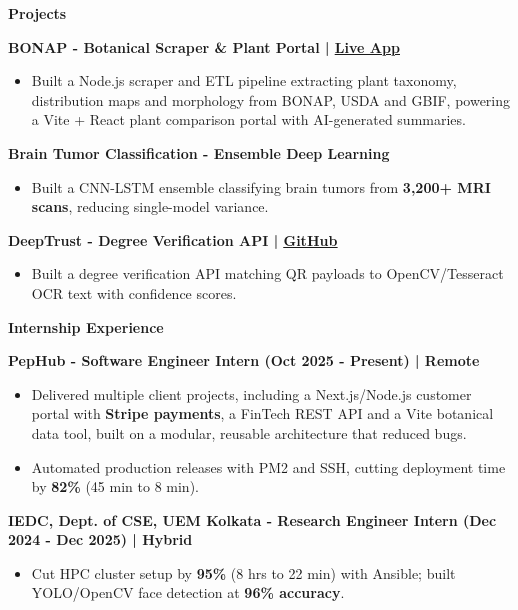 \documentclass[10pt,a4paper]{article}
\newcommand{\heading}[1]{{\carlito #1}}
\newcommand{\cvsection}[1]{%
  \par\vspace{7pt}%
  {\heading{\color{sectioncolor}\large\bfseries #1}}\par\vspace{1pt}}
\newcommand{\cvsubsection}[1]{%
  \par\vspace{4pt}%
  {\heading{\color{subcolor}\bfseries #1}}\par}
\newcommand{\contactlink}[2]{\href{#1}{\color{sectioncolor}\underline{#2}}}
\newcommand{\cvrole}[4]{\cvsubsection{#1 - #2 (#3) | #4}}
\begin{document}
\cvsection{Projects}

\cvsubsection{BONAP - Botanical Scraper \& Plant Portal | \contactlink{https://bonap-frontend.onrender.com/}{Live App}}
\begin{itemize}
  \item Built a Node.js scraper and ETL pipeline extracting plant taxonomy, distribution maps and morphology from BONAP,
        USDA and GBIF, powering a Vite + React plant comparison portal with AI-generated summaries.
\end{itemize}

\cvsubsection{Brain Tumor Classification - Ensemble Deep Learning}
\begin{itemize}
  \item Built a CNN-LSTM ensemble classifying brain tumors from \textbf{3,200+ MRI scans}, reducing single-model variance.
\end{itemize}

\cvsubsection{DeepTrust - Degree Verification API | \contactlink{https://github.com/Soumika-11/deeptrust}{GitHub}}
\begin{itemize}
  \item Built a degree verification API matching QR payloads to OpenCV/Tesseract OCR text with confidence scores.
\end{itemize}

\cvsection{Internship Experience}

\cvrole{PepHub}{Software Engineer Intern}{Oct 2025 - Present}{Remote}
\begin{itemize}
  \item Delivered multiple client projects, including a Next.js/Node.js customer portal with \textbf{Stripe payments}, a
        FinTech REST API and a Vite botanical data tool, built on a modular, reusable architecture that reduced bugs.
  \item Automated production releases with PM2 and SSH, cutting deployment time by \textbf{82\%} (45 min to 8 min).
\end{itemize}

\cvrole{IEDC, Dept. of CSE, UEM Kolkata}{Research Engineer Intern}{Dec 2024 - Dec 2025}{Hybrid}
\begin{itemize}
  \item Cut HPC cluster setup by \textbf{95\%} (8 hrs to 22 min) with Ansible; built YOLO/OpenCV face detection at \textbf{96\% accuracy}.
\end{itemize}
\end{document}

